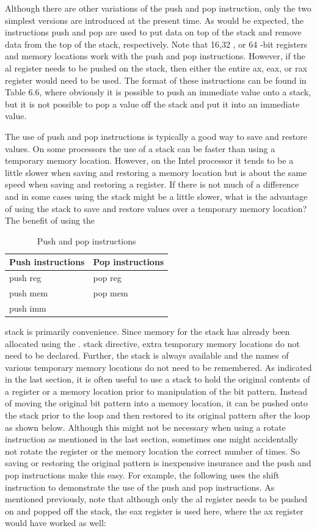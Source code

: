 \documentclass[10pt]{book}
\begin{document}
Although there are other variations of the push and pop instruction, only the two simplest versions are introduced at the present time. As would be expected, the instructions push and pop are used to put data on top of the stack and remove data from the top of the stack, respectively. Note that 16,32 , or 64 -bit registers and memory locations work with the push and pop instructions. However, if the al register needs to be pushed on the stack, then either the entire ax, eax, or rax register would need to be used. The format of these instructions can be found in Table 6.6, where obviously it is possible to push an immediate value onto a stack, but it is not possible to pop a value off the stack and put it into an immediate value.

The use of push and pop instructions is typically a good way to save and restore values. On some processors the use of a stack can be faster than using a temporary memory location. However, on the Intel processor it tends to be a little slower when saving and restoring a memory location but is about the same speed when saving and restoring a register. If there is not much of a difference and in some cases using the stack might be a little slower, what is the advantage of using the stack to save and restore values over a temporary memory location? The benefit of using the

\begin{table}[htbp]
\centering
\begin{tabular}{|l l|}
\hline
\textbf{Push instructions} & \textbf{Pop instructions} \\
\hline
push reg & pop reg \\
push mem & pop mem \\
push imm &  \\
\hline
\end{tabular}
\caption{Push and pop instructions}
\end{table}

stack is primarily convenience. Since memory for the stack has already been allocated using the . stack directive, extra temporary memory locations do not need to be declared. Further, the stack is always available and the names of various temporary memory locations do not need to be remembered.
As indicated in the last section, it is often useful to use a stack to hold the original contents of a register or a memory location prior to manipulation of the bit pattern. Instead of moving the original bit pattern into a memory location, it can be pushed onto the stack prior to the loop and then restored to its original pattern after the loop as shown below. Although this might not be necessary when using a rotate instruction as mentioned in the last section, sometimes one might accidentally not rotate the register or the memory location the correct number of times. So saving or restoring the original pattern is inexpensive insurance and the push and pop instructions make this easy. For example, the following uses the shift instruction to demonstrate the use of the push and pop instructions. As mentioned previously, note that although only the al register needs to be pushed on and popped off the stack, the eax register is used here, where the ax register would have worked as well:
\end{document}
